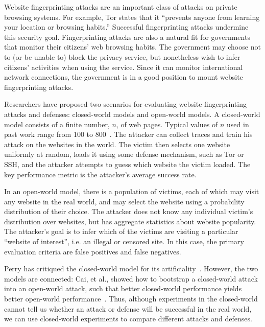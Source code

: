 \documentclass[10pt,journal]{IEEEtran}
\begin{document}
Website fingerprinting attacks are an important class of attacks on
private browsing systems.  For example, Tor states that it ``prevents
anyone from learning your location or browsing habits.''\cite{tor-website}  Successful
fingerprinting attacks undermine this security goal.  Fingerprinting
attacks are also a natural fit for governments that monitor their
citizens' web browsing habits.  The government may choose not to (or
be unable to) block the privacy service, but nonetheless wish to infer
citizens' activities when using the service.  Since it can monitor
international network connections, the government is in a good
position to mount website fingerprinting attacks.

Researchers have proposed two scenarios for evaluating website
fingerprinting attacks and defenses: closed-world models and 
open-world models.  A closed-world model consists of a finite number,
$n$, of web pages.  Typical values of $n$ used in past work range from
100 to 800~\cite{dyer-snp12,cai-ccs12,panchenko-wpes11}.  The attacker
can collect traces and train his attack on the websites in the world.
The victim then selects one website uniformly at random, loads it
using some defense mechanism, such as Tor or SSH, and the attacker
attempts to guess which website the victim loaded.  The key
performance metric is the attacker's average success rate.

In an open-world model, there is a population of victims, each of
which may visit any website in the real world, and may select the
website using a probability distribution of their choice. The attacker
does not know any individual victim's distribution over websites, but
has aggregate statistics about website popularity.  The attacker's
goal is to infer which of the victims are visiting a particular
``website of interest'', i.e. an illegal or censored site.  In this
case, the primary evaluation criteria are false positives and false
negatives.  

Perry has critiqued the closed-world model for its
artificiality~\cite{perry-critique}. However, the two models are
connected: Cai, et al., showed how to bootstrap a closed-world attack
into an open-world attack, such that better closed-world performance
yields better open-world performance~\cite{cai-ccs12}.  Thus, although
experiments in the closed-world cannot tell us whether an attack or
defense will be successful in the real world, we can use closed-world
experiments to compare different attacks and defenses.
\end{document}
